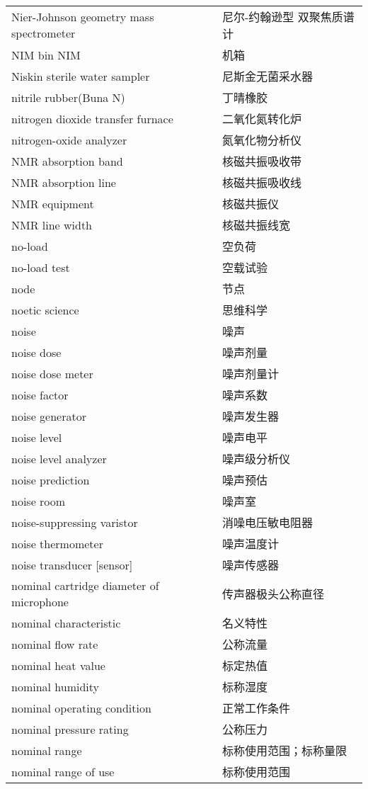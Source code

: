 \documentclass[
]{article}
\begin{document}
\begin{longtable}[]{@{}ll@{}}
Nier-Johnson geometry mass spectrometer & 尼尔-约翰逊型 双聚焦质谱计 \\
NIM bin NIM & 机箱 \\
Niskin sterile water sampler & 尼斯金无菌采水器 \\
nitrile rubber(Buna N) & 丁晴橡胶 \\
nitrogen dioxide transfer furnace & 二氧化氮转化炉 \\
nitrogen-oxide analyzer & 氮氧化物分析仪 \\
NMR absorption band & 核磁共振吸收带 \\
NMR absorption line & 核磁共振吸收线 \\
NMR equipment & 核磁共振仪 \\
NMR line width & 核磁共振线宽 \\
no-load & 空负荷 \\
no-load test & 空载试验 \\
node & 节点 \\
noetic science & 思维科学 \\
noise & 噪声 \\
noise dose & 噪声剂量 \\
noise dose meter & 噪声剂量计 \\
noise factor & 噪声系数 \\
noise generator & 噪声发生器 \\
noise level & 噪声电平 \\
noise level analyzer & 噪声级分析仪 \\
noise prediction & 噪声预估 \\
noise room & 噪声室 \\
noise-suppressing varistor & 消噪电压敏电阻器 \\
noise thermometer & 噪声温度计 \\
noise transducer {[}sensor{]} & 噪声传感器 \\
nominal cartridge diameter of microphone & 传声器极头公称直径 \\
nominal characteristic & 名义特性 \\
nominal flow rate & 公称流量 \\
nominal heat value & 标定热值 \\
nominal humidity & 标称湿度 \\
nominal operating condition & 正常工作条件 \\
nominal pressure rating & 公称压力 \\
nominal range & 标称使用范围；标称量限 \\
nominal range of use & 标称使用范围 \\

\end{longtable}
\end{document}
